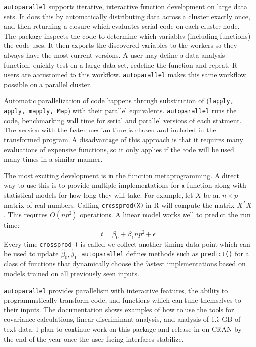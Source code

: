 \documentclass[12pt]{article}
\begin{document}
\texttt{autoparallel} supports iterative, interactive function development
on large data sets. It does this by automatically distributing data across
a cluster exactly once, and then returning a closure which evaluates serial
code on each cluster node. The package inspects the code to determine which
variables (including functions) the code uses. It then exports the
discovered variables to the workers so they always have the most current
versions.  A user may define a data analysis function, quickly test on a
large data set, redefine the function and repeat. R users are accustomed to
this workflow. \texttt{autoparallel} makes this same workflow possible on a
parallel cluster.

Automatic parallelization of code happens through substitution of
(\texttt{lapply, apply, mapply, Map}) with their parallel equivalents.
\texttt{autoparallel} runs the code, benchmarking wall time for serial and
parallel versions of each statment.  The version with the faster median
time is chosen and included in the transformed program.  A disadvantage of
this approach is that it requires many evaluations of expensive functions,
so it only applies if the code will be used many times in a similar manner.

The most exciting development is in the function metaprogramming. A direct
way to use this is to provide multiple implementations for a function along
with statistical models for how long they will take. For example, let $X$
be an $n \times p$ matrix of real numbers. Calling \texttt{crossprod(X)} in
R will compute the matrix $X^T X$. This requires $O(np^2)$ operations.
A linear model works well to predict the run
time:
\[
    t = \beta_0 + \beta_1 np^2 + \epsilon
\]
Every time
\texttt{crossprod()} is called we collect another timing data point which
can be used to update $\hat{\beta}_0, \hat{\beta}_1$. \texttt{autoparallel}
defines methods such as \texttt{predict()} for a class of functions that dynamically
choose the fastest implementations based on models trained on all
previously seen inputs.


\texttt{autoparallel} provides parallelism with interactive features, the
ability to programmatically transform code, and functions which can tune
themselves to their inputs.
The documentation
shows examples of how to use the tools for covariance calculations, linear
discriminant analysis, and analysis of 1.3 GB of text data. I plan to
continue work on this package and release in on CRAN by the end of the year
once the user facing interfaces stabilize.

\hfill


 
\end{document}
